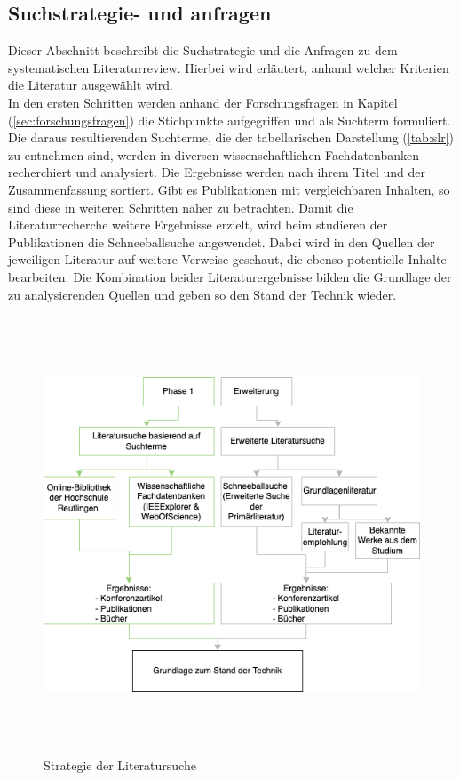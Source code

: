     \subsection{Suchstrategie- und anfragen}
        Dieser Abschnitt beschreibt die Suchstrategie und die Anfragen zu dem systematischen Literaturreview. Hierbei wird 
        erläutert, anhand welcher Kriterien die Literatur ausgewählt wird.
        \\
        In den ersten Schritten werden anhand der Forschungsfragen in Kapitel (\ref{sec:forschungsfragen}) die Stichpunkte 
        aufgegriffen und als Suchterm formuliert. Die daraus resultierenden Suchterme, die der tabellarischen Darstellung 
        (\ref{tab:slr}) zu entnehmen sind, werden in diversen wissenschaftlichen Fachdatenbanken recherchiert und analysiert. 
        Die Ergebnisse werden nach ihrem Titel und der Zusammenfassung sortiert. Gibt es Publikationen mit vergleichbaren 
        Inhalten, so sind diese in weiteren Schritten näher zu betrachten. Damit die Literaturrecherche weitere Ergebnisse 
        erzielt, wird beim studieren der Publikationen die Schneeballsuche angewendet. Dabei wird in den Quellen der jeweiligen 
        Literatur auf weitere Verweise geschaut, die ebenso potentielle Inhalte bearbeiten. Die Kombination beider 
        Literaturergebnisse bilden die Grundlage der zu analysierenden Quellen und geben so den Stand der Technik wieder.
        \begin{figure}[hbt!]
            \centering
            \includegraphics[width=13cm,height=13cm,keepaspectratio]{images/slr_walkthrough.png}
            \caption{Strategie der Literatursuche}
            \label{fig:slr}
        \end{figure}
